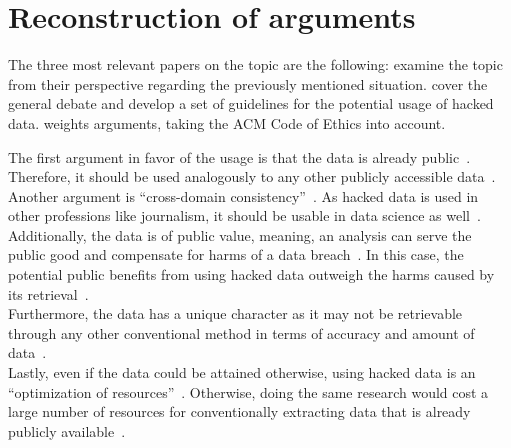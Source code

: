 \section*{Reconstruction of arguments}

The three most relevant papers on the topic are the following:
\textcite{patreon} examine the topic from their perspective regarding the previously mentioned situation.
\textcite{nature} cover the general debate and develop a set of guidelines for the potential usage of hacked data.
\textcite{acm} weights arguments, taking the ACM Code of Ethics into account.

The first argument in favor of the usage is that the data is already public~\parencite[][5]{patreon}.
Therefore, it should be used analogously to any other publicly accessible data~\parencite[][23]{acm}.\\
Another argument is ``cross-domain consistency''~\parencite[][746]{nature}.
As hacked data is used in other professions like journalism, it should be usable in data science as well~\parencite[][745]{nature}.\\
Additionally, the data is of public value, meaning, an analysis can serve the public good and compensate for harms of a data breach~\parencites[][5]{patreon}[][23]{acm}.
In this case, the potential public benefits from using hacked data outweigh the harms caused by its retrieval~\parencite[][23]{acm}.\\
Furthermore, the data has a unique character as it may not be retrievable through any other conventional method in terms of accuracy and amount of data~\parencites[][745]{nature}[][5]{patreon}.\\
Lastly, even if the data could be attained otherwise, using hacked data is an ``optimization of resources''~\parencite[][746]{nature}.
Otherwise, doing the same research would cost a large number of resources for conventionally extracting data that is already publicly available~\parencite[][745]{nature}.

